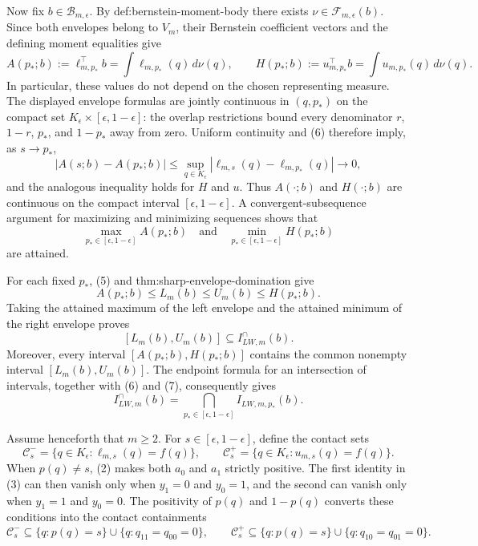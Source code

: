 Now fix \(b\in\mathcal B_{m,\epsilon}\). By
def:bernstein-moment-body there exists
\(\nu\in\mathcal F_{m,\epsilon}(b)\). Since both envelopes belong to
\(V_m\), their Bernstein coefficient vectors and the defining moment equalities
give
\[
A(p_*;b):=\ell_{m,p_*}^{\top}b
=\int\ell_{m,p_*}(q)\,d\nu(q),
\qquad
H(p_*;b):=u_{m,p_*}^{\top}b
=\int u_{m,p_*}(q)\,d\nu(q).                                    \tag{6}
\]
In particular, these values do not depend on the chosen representing measure.
The displayed envelope formulas are jointly continuous in \((q,p_*)\) on the
compact set \(K_{\epsilon}\times[\epsilon,1-\epsilon]\): the overlap
restrictions bound every denominator \(r\), \(1-r\), \(p_*\), and
\(1-p_*\) away from zero. Uniform continuity and (6) therefore imply, as
\(s\to p_*\),
\[
|A(s;b)-A(p_*;b)|
\leq\sup_{q\in K_{\epsilon}}
|\ell_{m,s}(q)-\ell_{m,p_*}(q)|\longrightarrow0,
\]
and the analogous inequality holds for \(H\) and \(u\). Thus \(A(\cdot;b)\)
and \(H(\cdot;b)\) are continuous on the compact interval
\([\epsilon,1-\epsilon]\). A convergent-subsequence argument for maximizing
and minimizing sequences shows that
\[
\max_{p_*\in[\epsilon,1-\epsilon]}A(p_*;b)
\quad\text{and}\quad
\min_{p_*\in[\epsilon,1-\epsilon]}H(p_*;b)                       \tag{7}
\]
are attained.

For each fixed \(p_*\), (5) and thm:sharp-envelope-domination give
\[
A(p_*;b)\leq L_m(b)\leq U_m(b)\leq H(p_*;b).                     \tag{8}
\]
Taking the attained maximum of the left envelope and the attained minimum of
the right envelope proves
\[
[L_m(b),U_m(b)]\subseteq I_{LW,m}^{\cap}(b).                      \tag{9}
\]
Moreover, every interval \([A(p_*;b),H(p_*;b)]\) contains the common nonempty
interval \([L_m(b),U_m(b)]\). The endpoint formula for an intersection of
intervals, together with (6) and (7), consequently gives
\[
I_{LW,m}^{\cap}(b)
=\bigcap_{p_*\in[\epsilon,1-\epsilon]}I_{LW,m,p_*}(b).            \tag{10}
\]

Assume henceforth that \(m\geq2\). For
\(s\in[\epsilon,1-\epsilon]\), define the contact sets
\[
\mathcal C_s^-=
\{q\in K_{\epsilon}:\ell_{m,s}(q)=f(q)\},
\qquad
\mathcal C_s^+=
\{q\in K_{\epsilon}:u_{m,s}(q)=f(q)\}.
\]
When \(p(q)\neq s\), (2) makes both \(a_0\) and \(a_1\) strictly positive.
The first identity in (3) can then vanish only when \(y_1=0\) and \(y_0=1\),
and the second can vanish only when \(y_1=1\) and \(y_0=0\). The positivity
of \(p(q)\) and \(1-p(q)\) converts these conditions into the contact
containments
\[
\mathcal C_s^-
\subseteq\{q:p(q)=s\}\cup\{q:q_{11}=q_{00}=0\},
\qquad
\mathcal C_s^+
\subseteq\{q:p(q)=s\}\cup\{q:q_{10}=q_{01}=0\}.                  \tag{11}
\]

